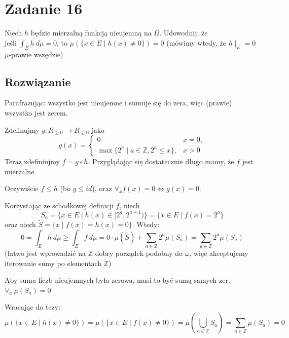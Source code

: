 \section{Zadanie 16}
Niech \(h\) będzie mierzalną funkcją nieujemną na \(\Omega\).
Udowodnij, że\\ jeśli \(\int_E h\ d\mu = 0\), to
\(\mu(\{x\in E \mid h(x) \neq 0\}) = 0\) (mówimy wtedy, że \(h\mid_E = 0\)
\(\mu\)-prawie wszędzie)
\subsection*{Rozwiązanie}
Parafrazując: wszystko jest nieujemne i sumuje się do zera, więc
(prawie) wszystko jest zerem.

Zdefinujmy \(g: R_{\geqslant0} \to R_{\geqslant0}\) jako
\[
	g(x) =
	\begin{cases}
		0                                                  & x=0, \\
		\max\{2^a \mid a\in{\mathbb Z}, 2^a \leqslant x\}, & x>0
	\end{cases}
\]
Teraz zdefiniujmy \(f = g \circ h\). Przyglądając się dostatecznie długo
mamy, że \(f\) jest mierzalne.

Oczywiście \(f \leqslant h\) (bo \(g\leqslant id\)), oraz
\(\forall_x f(x) = 0 \Leftrightarrow g(x) = 0\).

Korzystając ze schodkowej definicji \(f\), niech \[S_a =
	\{x\in E\mid h(x) \in [2^a, 2^{a+1})\} = \{x\in E\mid f(x) = 2^a\}\]
oraz niech \(\widetilde S = \{x\mid f(x) = h(x) = 0\}\). Wtedy:
\[
	0 = \int_E h\ d\mu \geqslant \int_E f\ d\mu
	= 0\cdot\mu(\widetilde S) + \sum_{a\in\mathbb{Z}} 2^a\mu(S_a)
	= \sum_{a\in\mathbb{Z}} 2^a\mu(S_a)
\]
{\tiny
(łatwo jest wprowadzić na \(\mathbb{Z}\) dobry porządek podobny do
\(\omega\), więc akceptujemy iterowanie sumy po elementach \(\mathbb Z\))
}

Aby suma liczb nieujemnych była zerowa, musi to być sumą samych zer.
\(\forall_a\ \mu(S_a) = 0\)

Wracając do tezy:
\[
	\mu(\{x\in E \mid h(x) \neq 0\})
	= \mu(\{x\in E \mid f(x) \neq 0\})
	= \mu(\bigcup_{a\in\mathbb Z} S_a)
	= \sum_{a\in\mathbb Z} \mu(S_a)
	= 0
\]
